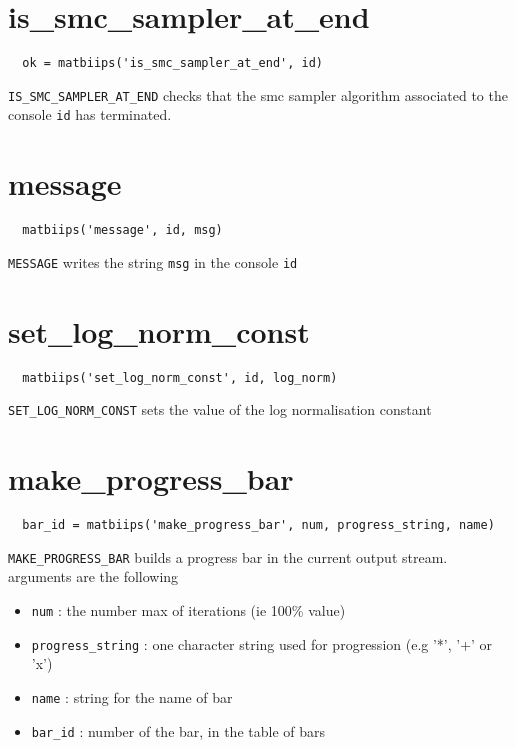 \documentclass[11pt,twoside]{article}
\begin{document}
\section{is\_smc\_sampler\_at\_end}

 \begin{lstlisting}
  ok = matbiips('is_smc_sampler_at_end', id)
 \end{lstlisting}
 \texttt{IS\_SMC\_SAMPLER\_AT\_END} checks that the smc sampler algorithm associated to the console \texttt{id} has terminated.


\section{message}

 \begin{lstlisting}
  matbiips('message', id, msg)
 \end{lstlisting}

  \texttt{MESSAGE} writes the string \texttt{msg} in the console \texttt{id}

\section{set\_log\_norm\_const}

 \begin{lstlisting}
  matbiips('set_log_norm_const', id, log_norm)
 \end{lstlisting}

  \texttt{SET\_LOG\_NORM\_CONST} sets the value of the log normalisation constant

\section{make\_progress\_bar}

 \begin{lstlisting}
  bar_id = matbiips('make_progress_bar', num, progress_string, name)
 \end{lstlisting}

 \texttt{MAKE\_PROGRESS\_BAR} builds a progress bar in the current output stream. arguments are the following
 \begin{itemize}
  \item \texttt{num} : the number max of iterations (ie 100\% value)
  \item \texttt{progress\_string} : one character string used for progression (e.g '*', '+' or 'x')
  \item \texttt{name} : string for the name of bar
  \item \texttt{bar\_id} : number of the bar, in the table of bars
  \end{itemize}
\end{document}

